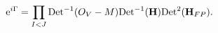 \begin{equation}\label{egamma}
{\rm e}^{i\Gamma}=\prod_{I<J}{\rm Det}^{-1} (O_{V}-M){\rm Det}^{-1}
({\bf H}){\rm Det}^{2} ({\bf H}_{FP}).
\end{equation}

